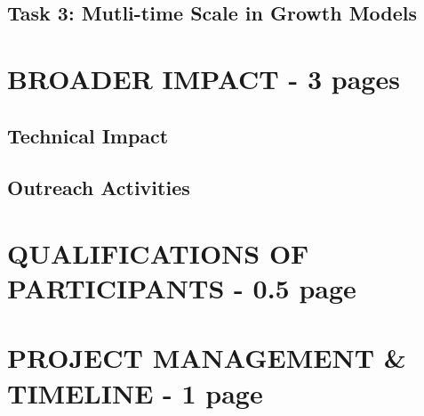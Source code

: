 \documentclass[12pt]{article}
\begin{document}
\subsection{Task 3: Mutli-time Scale in Growth Models}


\section{BROADER IMPACT - 3 pages}

\subsection{Technical Impact}

\subsection{Outreach Activities}


\section{QUALIFICATIONS OF PARTICIPANTS - 0.5 page}

\section{PROJECT MANAGEMENT \& TIMELINE - 1 page}
\end{document}
